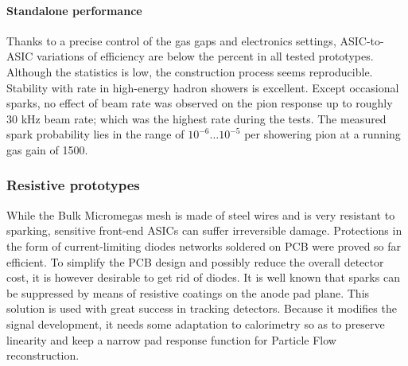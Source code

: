 \paragraph{Standalone performance}
Thanks to a precise control of the gas gaps and electronics settings, ASIC-to-ASIC variations of efficiency are below the percent in all tested prototypes. Although the statistics is low, the construction process seems reproducible. Stability with rate in high-energy hadron showers is excellent. Except occasional sparks, no effect of beam rate was observed on the pion response up to roughly 30 kHz beam rate; which was the highest rate during the tests. The measured spark probability lies in the range of $10^{-6} \ldots 10^{-5}$ per showering pion at a running gas gain of 1500.

\subsubsection{Resistive prototypes}

While the Bulk Micromegas mesh is made of steel wires and is very resistant to sparking, sensitive front-end ASICs can suffer irreversible damage. Protections in the form of current-limiting diodes networks soldered on PCB were proved so far efficient. To simplify the PCB design and possibly reduce the overall detector cost, it is however desirable to get rid of diodes. It is well known that sparks can be suppressed by means of resistive coatings on the anode pad plane. This solution is used with great success in tracking detectors. Because it modifies the signal development, it needs some adaptation to calorimetry so as to preserve linearity and keep a narrow pad response function for Particle Flow reconstruction.


